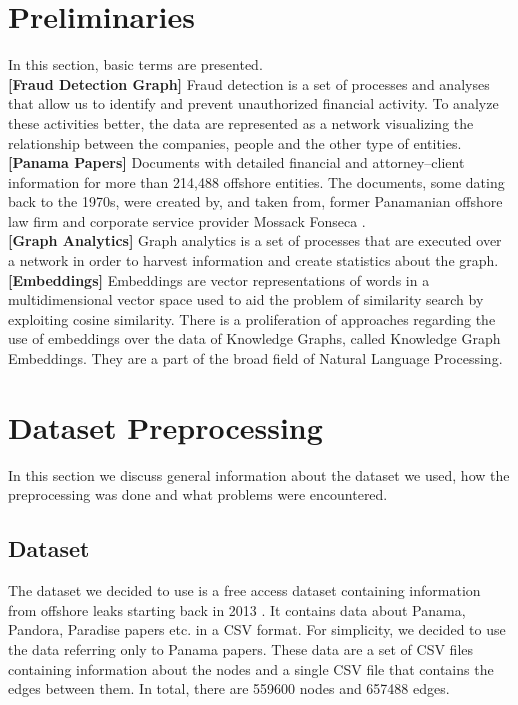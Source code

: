 \documentclass[sigconf, nonacm]{acmart}
\begin{document}
\section{Preliminaries}
In this section, basic terms are presented.\\
\textbf{[Fraud Detection Graph]} Fraud detection is a set of processes and analyses that allow us to identify and prevent unauthorized financial activity. To analyze these activities better, the data are represented as a network visualizing the relationship between the companies, people and the other type of entities.\\ 
\textbf{[Panama Papers]}
Documents with detailed financial and attorney–client information for more than 214,488 offshore entities. The documents, some dating back to the 1970s, were created by, and taken from, former Panamanian offshore law firm and corporate service provider Mossack Fonseca \cite{obermaier2017panama}.\\
\textbf{[Graph Analytics]} Graph analytics is a set of processes that are executed over a network in order to harvest information and create statistics about the graph.\\ 
\textbf{[Embeddings]} Embeddings are vector representations of words in a multidimensional vector space used to aid the problem of similarity search by exploiting cosine similarity. There is a proliferation of approaches regarding the use of embeddings over the data of Knowledge Graphs, called Knowledge Graph Embeddings. They are a part of the broad field of Natural Language Processing.

\section{Dataset Preprocessing}
In this section we discuss general information about the dataset we used, how the preprocessing was done and what problems were encountered.
\subsection{Dataset}
The dataset we decided to use is a free access dataset containing information from offshore leaks starting back in 2013 \cite{datasetPanamaPapers}. It contains data about Panama, Pandora, Paradise papers etc. in a CSV format. For simplicity, we decided to use the data referring only to Panama papers. These data are a set of CSV files containing information about the nodes and a single CSV file that contains the edges between them. In total, there are 559600 nodes and 657488 edges.
\end{document}
